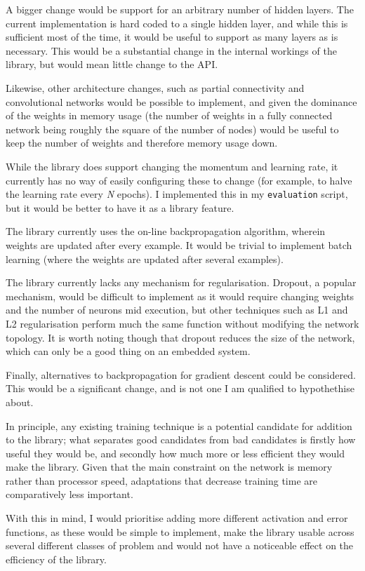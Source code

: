 \documentclass[a4paper]{article}
\begin{document}
A bigger change would be support for an arbitrary number of hidden layers. The current implementation is hard coded to a single hidden layer, and while this is sufficient most of the time, it would be useful to support as many layers as is necessary. 
This would be a substantial change in the internal workings of the library, but would mean little change to the API.

Likewise, other architecture changes, such as partial connectivity and convolutional networks would be possible to implement, and given the dominance of the weights in memory usage (the number of weights in a fully connected network being roughly the square of the number of nodes) would be useful to keep the number of weights and therefore memory usage down.

While the library does support changing the momentum and learning rate, it currently has no way of easily configuring these to change (for example, to halve the learning rate every \textit{N} epochs). I implemented this in my \lstinline{evaluation} script, but it would be better to have it as a library feature.

The library currently uses the on-line backpropagation algorithm, wherein weights are updated after every example. It would be trivial to implement batch learning (where the weights are updated after several examples). 

The library currently lacks any mechanism for regularisation. Dropout, a popular mechanism, would be difficult to implement as it would require changing weights and the number of neurons mid execution, but other techniques such as L1 and L2 regularisation perform much the same function without modifying the network topology. It is worth noting though that dropout reduces the size of the network, which can only be a good thing on an embedded system.

Finally, alternatives to backpropagation for gradient descent could be considered. This would be a significant change, and is not one I am qualified to hypothethise about.

In principle, any existing training technique is a potential candidate for addition to the library; what separates good candidates from bad candidates is firstly how useful they would be, and secondly how much more or less efficient they would make the library. Given that the main constraint on the network is memory rather than processor speed, adaptations that decrease training time are comparatively less important.

With this in mind, I would prioritise adding more different activation and error functions, as these would be simple to implement, make the library usable across several different classes of problem and would not have a noticeable effect on the efficiency of the library.
\end{document}
